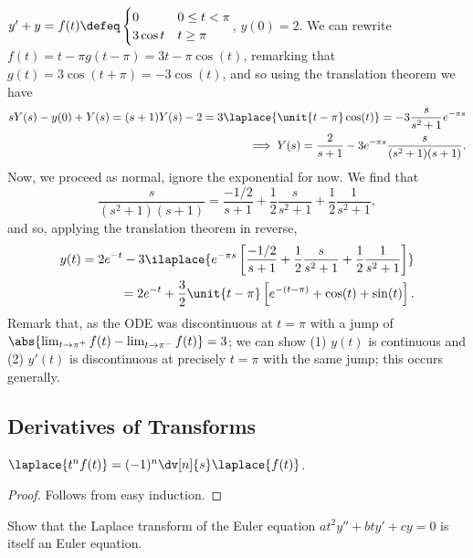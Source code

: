 \begin{example}
    $y' + y = f(t) \defeq \begin{cases}
        0 & 0 \leq t < \pi\\
        3 \cos t & t \geq \pi
    \end{cases}$, $y(0) = 2$. We can rewrite $f(t) = \unit{t-\pi}g(t-\pi) = 3\unit{t - \pi}\cos(t)$, remarking that $g(t) = 3\cos(t+\pi)=-3\cos (t)$, and so using the translation theorem we have \begin{align*}
        sY(s)-y(0)+Y(s)=(s+1)Y(s)-2 = 3\laplace{\unit{t - \pi}\cos(t)} = -3 \frac{s}{s^2+1}e^{-\pi s}\\
        \implies Y(s) = \frac{2}{s+1} - 3e^{-\pi s} \frac{s}{(s^2+1)(s+1)}.
    \end{align*}
    Now, we proceed as normal, ignore the exponential for now. We find that \[
    \frac{s}{(s^2+1)(s+1)}     = \frac{-1/2}{s+1}+\frac{1}{2} \frac{s}{s^2+1}+\frac{1}{2}\frac{1}{s^2+1},
    \]
    and so, applying the translation theorem in reverse, \begin{align*}
        y(t) = 2 e^{-t} -3 \ilaplace{e^{-\pi s}\left[\frac{-1/2}{s+1}+\frac{1}{2} \frac{s}{s^2+1}+\frac{1}{2}\frac{1}{s^2+1}\right]}\\
        = 2e^{-t} + \frac{3}{2} \unit{t - \pi}\left[e^{-(t-\pi)}+ \cos (t) + \sin (t)\right].
    \end{align*}
    Remark that, as the ODE was discontinuous at $t = \pi$ with a jump of $\abs{\lim_{t \to \pi^+} f(t) - \lim_{t \to \pi^-} f(t)} = 3$; we can show (1) $y(t)$ is continuous and (2) $y'(t)$ is discontinuous at precisely $t = \pi$ with the same jump; this occurs generally.
\end{example}

\subsection{Derivatives of Transforms}

\begin{proposition}
    $\laplace{t^n f(t)} = (-1)^n \dv[n]{s} \laplace{f(t)}$.
\end{proposition}

\begin{proof}
    Follows from easy induction.
\end{proof}

\begin{example}
    Show that the Laplace transform of the Euler equation $at^2 y'' + bty'+cy=0$ is itself an Euler equation.
\end{example}


